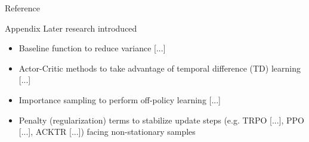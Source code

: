 \documentclass[10pt]{beamer}
\theoremstyle{definition}
\begin{document}
\begin{frame}{Reference}

\end{frame}


\begin{frame}{Appendix}
Later research introduced
\begin{itemize}
    \item Baseline function to reduce variance [...]
    \item Actor-Critic methods to take advantage of temporal difference (TD) learning [...]
    \item Importance sampling to perform off-policy learning [...]
    \item Penalty (regularization) terms to stabilize update steps (e.g. TRPO [...], PPO [...], ACKTR [...]) facing non-stationary samples
\end{itemize}
\end{frame}
\end{document}
